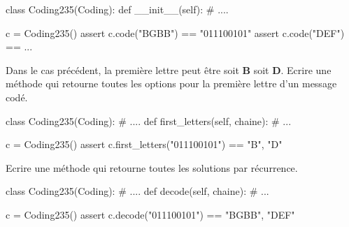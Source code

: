 \begin{xexercice}
\begin{verbatimx}
class Coding235(Coding):
    def __init__(self):
        # ....

c = Coding235()
assert c.code("BGBB") == "011100101"
assert c.code("DEF") == ...
\end{verbatimx}

\exequest Dans le cas précédent, la première lettre peut être soit \textbf{B} soit \textbf{D}.
Ecrire une méthode qui retourne toutes les options pour la première lettre d'un message codé.

\begin{verbatimx}
class Coding235(Coding):
    # ....
    def first_letters(self, chaine):
         # ...
        
c = Coding235()
assert c.first_letters("011100101") == {"B", "D"}
\end{verbatimx}

\exequest Ecrire une méthode  qui retourne toutes les solutions par récurrence.

\begin{verbatimx}
class Coding235(Coding):
    # ....
    def decode(self, chaine):
         # ...

c = Coding235()
assert c.decode("011100101") == {"BGBB", "DEF"}
\end{verbatimx}

\end{xexercice}




%
